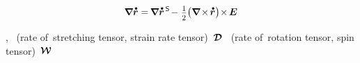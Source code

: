 \nopagebreak\vspace{-0.1em}\begin{equation*}
\boldnabla \mathdotabove{\currentlocationvector}
= \hspace{-0.2ex} \boldnabla \mathdotabove{\currentlocationvector}^{\hspace{.3ex}\mathsf{S}} \hspace{-0.25ex}
- \hspace{.1ex} \smalldisplaystyleonehalf \bigl( \boldnabla \hspace{-0.25ex}\times\hspace{-0.25ex} \mathdotabove{\currentlocationvector} \bigr) \hspace{-0.4ex} \times \hspace{-0.2ex} \UnitDyad
\end{equation*}

\vspace{-0.1em}\noindent
{},
~(rate of~stretching tensor, strain rate tensor)~${\bm{\mathcal{D}}}$
~(rate of~rotation tensor, spin tensor)~${\vorticitytensor}$

